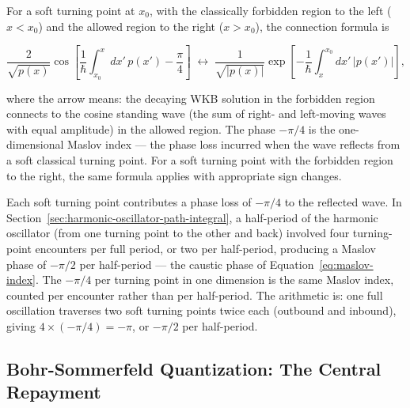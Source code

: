 For a soft turning point at $x_0$, with the classically forbidden region to the left ($x < x_0$) and the allowed region to the right ($x > x_0$), the connection formula is
\begin{linenomath}
\begin{equation}
\frac{2}{\sqrt{p(x)}}\cos\left[\frac{1}{\hbar}\int_{x_0}^x dx'\,p(x') - \frac{\pi}{4}\right]
\;\longleftrightarrow\;
\frac{1}{\sqrt{|p(x)|}}\exp\left[-\frac{1}{\hbar}\int_x^{x_0} dx'\,|p(x')|\right],
\label{eq:connection-formulas}
\end{equation}
\end{linenomath}
where the arrow means: the decaying WKB solution in the forbidden region connects to the cosine standing wave (the sum of right- and left-moving waves with equal amplitude) in the allowed region. The phase $-\pi/4$ is the one-dimensional Maslov index --- the phase loss incurred when the wave reflects from a soft classical turning point. For a soft turning point with the forbidden region to the right, the same formula applies with appropriate sign changes.

Each soft turning point contributes a phase loss of $-\pi/4$ to the reflected wave. In Section~\ref{sec:harmonic-oscillator-path-integral}, a half-period of the harmonic oscillator (from one turning point to the other and back) involved four turning-point encounters per full period, or two per half-period, producing a Maslov phase of $-\pi/2$ per half-period --- the caustic phase of Equation~\eqref{eq:maslov-index}. The $-\pi/4$ per turning point in one dimension is the same Maslov index, counted per encounter rather than per half-period. The arithmetic is: one full oscillation traverses two soft turning points twice each (outbound and inbound), giving $4 \times (-\pi/4) = -\pi$, or $-\pi/2$ per half-period.

\subsection{Bohr-Sommerfeld Quantization: The Central Repayment}


